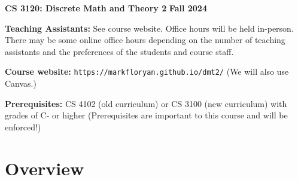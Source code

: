 \documentclass[12pt]{article}
\begin{document}
\textbf{\Large CS 3120: Discrete Math and Theory 2} \hfill \textbf{\Large Fall 2024}

\vskip 0.5in 


\vskip 0.1in
\textbf{Teaching Assistants:} See course website.  Office hours will be held in-person. There may be some online office hours depending on the number of teaching assistants and the preferences of the students and course staff.

\vskip 0.1in
\textbf{Course website:} {\tt https://markfloryan.github.io/dmt2/} (We will also use Canvas.)

\textbf{Prerequisites:} CS 4102 (old curriculum) or CS 3100 (new curriculum) with grades of C- or higher (Prerequisites are important to this course and will be enforced!)

\section*{Overview}
\end{document}
